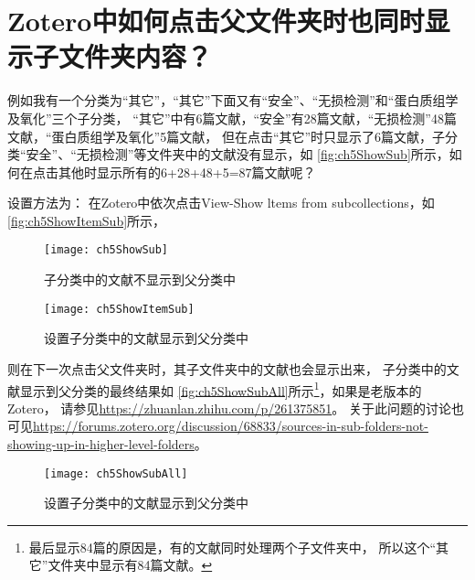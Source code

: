 \documentclass[cn,11pt,chinese]{elegantbook}
\begin{document}
			\section{Zotero中如何点击父文件夹时也同时显示子文件夹内容？}\label{sec:ShowSub}	
				例如我有一个分类为“其它”，“其它”下面又有“安全”、“无损检测”和“蛋白质组学及氧化”三个子分类，
				“其它”中有6篇文献，“安全”有28篇文献，“无损检测”48篇文献，“蛋白质组学及氧化”5篇文献，
				但在点击“其它”时只显示了6篇文献，子分类“安全”、“无损检测”等文件夹中的文献没有显示，如
				\autoref{fig:ch5ShowSub}所示，如何在点击其他时显示所有的6+28+48+5=87篇文献呢？


				设置方法为：
				在Zotero中依次点击View-Show ltems from subcollections，如
				\autoref{fig:ch5ShowItemSub}所示，
				\begin{figure}[ht]
					\centering
					\texttt{[image: ch5ShowSub]}
					\caption{子分类中的文献不显示到父分类中}
					\label{fig:ch5ShowSub}
				\end{figure}	
				\begin{figure}[ht]
					\centering
					\texttt{[image: ch5ShowItemSub]}
					\caption{设置子分类中的文献显示到父分类中}
					\label{fig:ch5ShowItemSub}
				\end{figure}
				则在下一次点击父文件夹时，其子文件夹中的文献也会显示出来，
				子分类中的文献显示到父分类的最终结果如
				\autoref{fig:ch5ShowSubAll}所示\footnote{
				最后显示84篇的原因是，有的文献同时处理两个子文件夹中，
				所以这个“其它”文件夹中显示有84篇文献。}，如果是老版本的
				Zotero，
				请参见\url{https://zhuanlan.zhihu.com/p/261375851}。
				关于此问题的讨论也可见\url{https://forums.zotero.org/discussion/68833/sources-in-sub-folders-not-showing-up-in-higher-level-folders}。
				\begin{figure}[ht]
					\centering
					\texttt{[image: ch5ShowSubAll]}
					\caption{设置子分类中的文献显示到父分类中}
					\label{fig:ch5ShowSubAll}
				\end{figure}
\end{document}
